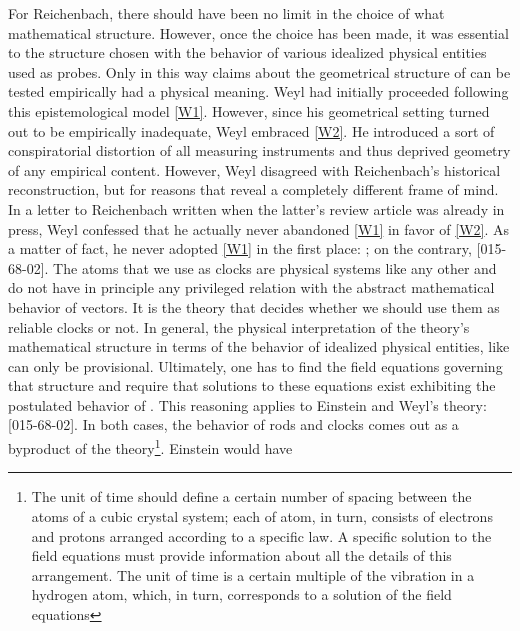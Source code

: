 \documentclass[draft]{article}
\newcommand{\WT}{Weyl's theory\xspace}
\begin{document}
For Reichenbach, there should have been no limit in the choice of what mathematical structure. However, once the choice has been made, it was essential to  the structure chosen with the behavior of various idealized physical entities used as probes. Only in this way claims about the geometrical structure of \spti can be tested empirically had a physical meaning. Weyl had initially proceeded following this epistemological model \ref{W1}. However, since his geometrical setting turned out to be empirically inadequate, Weyl embraced \ref{W2}. He introduced a sort of conspiratorial distortion of all measuring instruments and thus deprived geometry of any empirical content. However, Weyl disagreed with Reichenbach's historical reconstruction, but for reasons that reveal a completely different frame of mind. In a letter to Reichenbach written when the latter's review article was already in press, Weyl confessed that he actually never abandoned \ref{W1} in favor of \ref{W2}. As a matter of fact, he never adopted \ref{W1} in the first place: ; on the contrary,  [015-68-02]. The atoms that we use as clocks are physical systems like any other and do not have in principle any privileged relation with the abstract mathematical behavior of vectors. It is the theory that decides whether we should use them as reliable clocks or not. In general, the physical interpretation of the theory's mathematical structure in terms of the behavior of idealized physical entities, like \rac can only be provisional. Ultimately, one has to find the field equations governing that structure and require that solutions to these equations exist exhibiting the postulated behavior of \rac. This reasoning applies to Einstein and \WT:  [015-68-02]. In both cases, the behavior of rods and clocks comes out as a byproduct of the theory\footnote{The unit of time should define a certain number of spacing between the atoms of a cubic crystal system; each of atom, in turn, consists of electrons and protons arranged according to a specific law. A specific solution to the field equations must provide information about all the details of this arrangement. The unit of time is a certain multiple of the vibration in a hydrogen atom, which, in turn, corresponds to a solution of the field equations}. Einstein would have 
\end{document}

